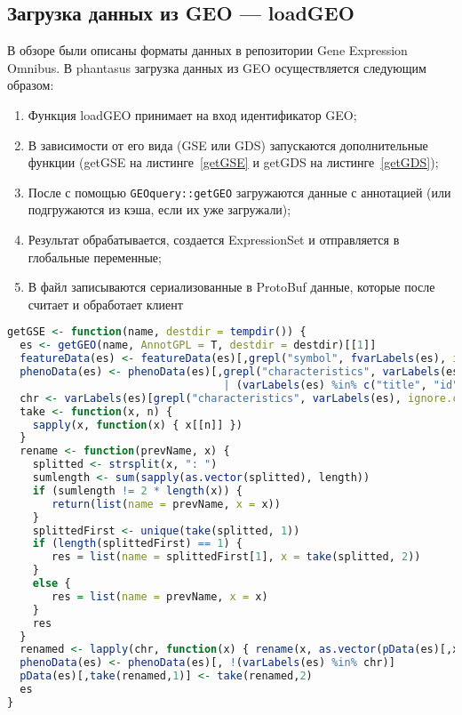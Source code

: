 \documentclass[annotation,specification]{itmo-student-thesis}
\begin{document}
\subsection{Загрузка данных из GEO --- loadGEO}
В обзоре были описаны форматы данных в репозитории Gene Expression Omnibus.
В phantasus загрузка данных из GEO осуществляется следующим образом:
\begin{enumerate}
\item Функция loadGEO принимает на вход идентификатор GEO;
\item В зависимости от его вида (GSE или GDS) запускаются дополнительные функции (getGSE на листинге~\ref{getGSE} и getGDS на листинге~\ref{getGDS});
\item После с помощью \texttt{GEOquery::getGEO} загружаются данные с аннотацией (или подгружаются из кэша, если их уже загружали);
\item Результат обрабатывается, создается ExpressionSet и отправляется в глобальные переменные;
\item В файл записываются сериализованные в ProtoBuf данные, которые после считает и обработает клиент
\end{enumerate}
\begin{lstlisting}[float=!h,caption={Загрузка данных типа GSE из Gene Expression Omnibus},label={getGSE},language=R]
getGSE <- function(name, destdir = tempdir()) {
  es <- getGEO(name, AnnotGPL = T, destdir = destdir)[[1]]
  featureData(es) <- featureData(es)[,grepl("symbol", fvarLabels(es), ignore.case = T)]
  phenoData(es) <- phenoData(es)[,grepl("characteristics", varLabels(es), ignore.case = T)
                                  | (varLabels(es) %in% c("title", "id", "geo_accession"))]
  chr <- varLabels(es)[grepl("characteristics", varLabels(es), ignore.case = T)]
  take <- function(x, n) {
    sapply(x, function(x) { x[[n]] })
  }
  rename <- function(prevName, x) {
    splitted <- strsplit(x, ": ")
    sumlength <- sum(sapply(as.vector(splitted), length))
    if (sumlength != 2 * length(x)) {
       return(list(name = prevName, x = x))
    }
    splittedFirst <- unique(take(splitted, 1))
    if (length(splittedFirst) == 1) {
       res = list(name = splittedFirst[1], x = take(splitted, 2))
    }
    else {
       res = list(name = prevName, x = x)
    }
    res
  }
  renamed <- lapply(chr, function(x) { rename(x, as.vector(pData(es)[,x])) })
  phenoData(es) <- phenoData(es)[, !(varLabels(es) %in% chr)]
  pData(es)[,take(renamed,1)] <- take(renamed,2)
  es
}
\end{lstlisting}
\end{document}
